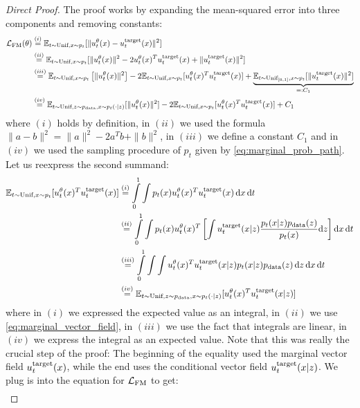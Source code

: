\begin{proof}[Direct Proof]
The proof works by expanding the mean-squared error into three components and removing constants:
\begin{align*}
    \mathcal{L}_{\text{FM}}(\theta)&\overset{(i)}{=}\mathbb{E}_{t\sim\text{Unif},x\sim p_t}[\|u_t^\theta(x) - u^{\text{target}}_t(x)\|^2]\\
    &\overset{(ii)}{=}\mathbb{E}_{t\sim\text{Unif},x\sim p_t}[\|u_t^\theta(x)\|^2 - 2u_t^\theta(x)^Tu^{\text{target}}_t(x) + \|u^{\text{target}}_t(x)\|^2]\\
    &\overset{(iii)}{=}\mathbb{E}_{t\sim\text{Unif},x\sim p_t}\left[\|u_t^\theta(x)\|^2\right] - 2\mathbb{E}_{t\sim\text{Unif},x\sim p_t}[u_t^\theta(x)^Tu^{\text{target}}_t(x)] + \underbrace{\mathbb{E}_{t\sim\text{Unif}_{[0,1]}, x\sim p_t}[\|u^{\text{target}}_t(x)\|^2]}_{=:C_1}\\
    &\overset{(iv)}{=}\mathbb{E}_{t\sim\text{Unif},z\sim p_{\rm{data}}, x\sim p_t(\cdot|z)}[\|u_t^\theta(x)\|^2] - 2\mathbb{E}_{t\sim\text{Unif},x\sim p_t}[u_t^\theta(x)^Tu^{\text{target}}_t(x)] + C_1
\end{align*}
where $(i)$ holds by definition, in $(ii)$ we used the formula $\|a-b\|^2=\|a\|^2-2a^Tb+\|b\|^2$, in $(iii)$ we define a constant $C_1$ and in $(iv)$ we used the sampling procedure of $p_t$ given by \cref{eq:marginal_prob_path}. Let us reexpress the second summand:
\begin{align*}
\mathbb{E}_{t\sim\text{Unif},x\sim p_t}[u_t^\theta(x)^Tu^{\text{target}}_t(x)]&\overset{(i)}{=}\int\limits_{0}^{1}\int p_t(x)u_t^\theta(x)^Tu^{\text{target}}_t(x)\,\mathrm{d} x\, \mathrm{d} t\\
&\overset{(ii)}{=}\int\limits_{0}^{1}\int p_t(x)u_t^\theta(x)^T\left[\int u^{\text{target}}_t(x|z)\frac{ p_t(x|z)p_{\rm{data}}(z)}{p_t(x)}\mathrm{d} z\right]\mathrm{d} x\, \mathrm{d} t\\
&\overset{(iii)}{=}\int\limits_{0}^{1}\int\int u_t^\theta(x)^Tu^{\text{target}}_t(x|z) p_t(x|z)p_{\rm{data}}(z)\,\mathrm{d} z\,\mathrm{d} x\, \mathrm{d} t\\
&\overset{(iv)}{=}\mathbb{E}_{t\sim\text{Unif},z\sim p_{\rm{data}}, x\sim p_t(\cdot|z)}[u_t^\theta(x)^Tu^{\text{target}}_t(x|z)]
\end{align*}
where in $(i)$ we expressed the expected value as an integral, in $(ii)$ we use \cref{eq:marginal_vector_field}, in $(iii)$ we use the fact that integrals are linear, in $(iv)$ we express the integral as an expected value. Note that this was really the crucial step of the proof: The beginning of the equality used the marginal vector field $u^{\text{target}}_t(x)$, while the end uses the conditional vector field $u^{\text{target}}_t(x|z)$. We plug is into the equation for $\mathcal{L}_{\text{FM}}$ to get:
\begin{align*}

\end{align*}
\end{proof}
